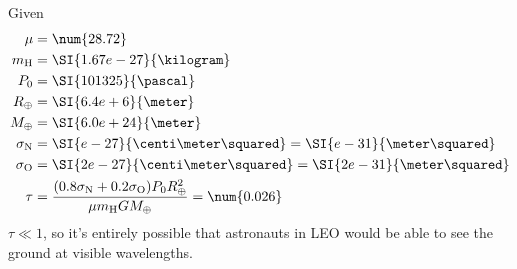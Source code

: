 \documentclass{article}
\begin{document}
\subsection{}

Given
\begin{align}
    \mu &= \num{28.72} \\
    m_{\ce{H}} &= \SI{1.67e-27}{\kilogram} \\
    P_0 &= \SI{101325}{\pascal} \\
    R_\oplus &= \SI{6.4e+6}{\meter} \\
    M_\oplus &= \SI{6.0e+24}{\meter} \\
    \sigma_{\ce{N}} &= \SI{e-27}{\centi\meter\squared} = \SI{e-31}{\meter\squared} \\
    \sigma_{\ce{O}} &= \SI{2e-27}{\centi\meter\squared} = \SI{2e-31}{\meter\squared} \\
    \tau &= \frac{(0.8\sigma_{\ce{N}} + 0.2\sigma_{\ce{O}}) P_0 R_\oplus^2}{\mu m_{\ce{H}} G M_\oplus} = \num{0.026}
\end{align}
\(\tau \ll 1\), so it's entirely possible that astronauts in LEO would be able to see the ground at visible wavelengths.
\end{document}
